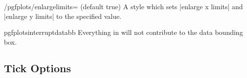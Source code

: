 \begin{stylekey}{/pgfplots/enlargelimits= (default true)}
	A style which sets |enlarge x limits| and |enlarge y limits| to the specified value.
\end{stylekey}

\begin{environment}{{pgfplotsinterruptdatabb}}
	Everything in  will not contribute to the data bounding box.
\end{environment}

\subsection{Tick Options}

